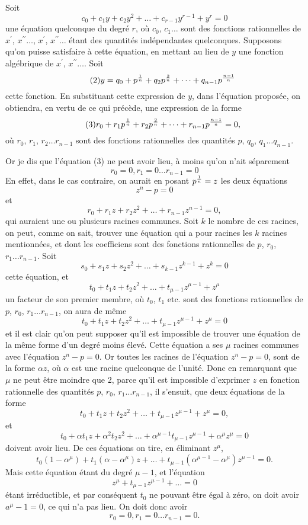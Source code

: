 \documentclass[oneside, 12 pt, leqno]{memoir}
\let\oldfrac\frac
\def\frac#1#2{\mathchoice{\text{\scalebox{.83}{${\oldfrac{#1}{#2}}$}}}{\text{\scalebox{.83}{${\displaystyle\oldfrac{#1}{#2}}$}}}{\genfrac{}{}{}{2}{#1}{#2}}{\genfrac{}{}{}{3}{#1}{#2}}}
\begin{document}
Soit
\[\tag{1} c_0+c_1 y+c_2 y^2+\dots+c_{r-1} y^{r-1}+y^r=0\]
une équation quelconque du degré \(r\), où \(c_0\), \(c_1 \dots\) sont des fonctions rationnelles de \(x^{\prime}\), \(x^{\prime \prime} \dots\), \(x^{\prime}\), \(x^{\prime \prime} \dots\) étant des quantités indépendantes quelconques. Supposons qu'on puisse satisfaire à cette équation, en mettant au lieu de \(y\) une fonction algébrique de \(x^{\prime}\), \(x^{\prime \prime} \dots\). Soit
\[\tag{2}y=q_0+p^{\frac{1}{n}}+q_2 p^{\frac{2}{n}}+\dots+q_{n-1} p^{\frac{n-1}{n}}\]
cette fonction. En substituant cette expression de \(y\), dans l'équation proposée, on obtiendra, en vertu de ce qui précède, une expression de la forme
\[\tag{3}r_0+r_1 p^{\frac{1}{n}}+r_2 p^{\frac{2}{n}}+\dots+r_{n-1} p^{\frac{n-1}{n}}=0,\]
où \(r_0\), \(r_1\), \(r_2 \dots r_{n-1}\) sont des fonctions rationnelles des quantités \(p\), \(q_0\), \(q_1 \dots q_{n-1}\).

Or je dis que l'équation (3) ne peut avoir lieu, à moins qu'on n'ait séparement
\[r_0=0, r_1=0 \dots r_{n-1}=0\]
En effet, dans le cas contraire, on aurait en posant \(p^{\frac{1}{n}}=z\) les deux équations
\[z^n-p=0\]
et
\[r_0+r_1 z+r_2 z^2+\dots+r_{n-1} z^{n-1}=0,\]
qui auraient une ou plusieurs racines communes. Soit \(k\) le nombre de ces racines, on peut, comme on sait, trouver une équation qui a pour racines les \(k\) racines mentionnées, et dont les coefficiens sont des fonctions rationnelles de \(p\), \(r_0\), \(r_1 \dots r_{n-1}\). Soit
\[s_0+s_1 z+s_2 z^2+\dots+s_{k-1} z^{k-1}+z^k=0\]
cette équation, et
\[t_0+t_1 z+t_2 z^2+\dots+t_{\mu-1} z^{\mu-1}+z^\mu\]
un facteur de son premier membre, où \(t_0\), \(t_1\) etc. sont des fonctions rationnelles de \(p\), \(r_0\), \(r_1 \dots r_{n-1}\), on aura de même
\[t_0+t_1 z+t_2 z^2+\dots+t_{\mu-1} z^{\mu-1}+z^\mu=0\]
et il est clair qu'on peut supposer qu’il est impossible de trouver une équation de la même forme d'un degré moins élevé. Cette équation a ses \(\mu\) racines communes avec l'équation \(z^n-p=0\). Or toutes les racines de l'équation \(z^n-p=0\), sont de la forme \(\alpha z\), où \(\alpha\) est une racine quelconque de l'unité. Donc en remarquant que \(\mu\) ne peut être moindre que 2, parce qu'il est impossible d'exprimer \(z\) en fonction rationnelle des quantités \(p\), \(r_0\), \(r_1 \dots r_{n-1}\), il s'ensuit, que deux équations de la forme
\[t_0+t_1 z+t_2 z^2+\dots+t_{\mu-1} z^{\mu-1}+z^\mu=0,\]
et
\[t_0+\alpha t_1 z+\alpha^2 t_2 z^2+\dots+\alpha^{\mu-1} t_{\mu-1} z^{\mu-1}+\alpha^\mu z^\mu=0\]
doivent avoir lieu. De ces équations on tire, en éliminant \(z^\mu\),
\[t_0\left(1-\alpha^\mu\right)+t_1\left(\alpha-\alpha^\mu\right) z+\dots+t_{\mu-1}\left(\alpha^{\mu-1}-\alpha^\mu\right) z^{\mu-1}=0.\]
Mais cette équation étant du degré \(\mu-1\), et l'équation
\[z^\mu+t_{\mu-1} z^{\mu-1}+\dots=0\]
étant irréductible, et par conséquent \(t_0\) ne pouvant être égal à zéro, on doit avoir \(a^\mu-1=0\), ce qui n'a pas lieu. On doit donc avoir
\[r_0=0, r_1=0 \dots r_{n-1}=0.\]
\end{document}
